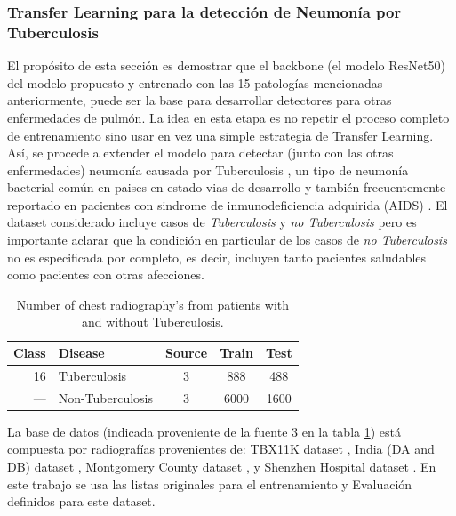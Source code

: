 {\subsubsection{Transfer Learning para la detección de Neumonía por Tuberculosis}

El propósito de esta sección es demostrar que el backbone (el modelo ResNet50) del modelo propuesto
y entrenado con las 15 patologías mencionadas anteriormente, puede ser la base para desarrollar
detectores para otras enfermedades de pulmón. La idea en esta etapa es no repetir el proceso
completo de entrenamiento sino usar en vez una simple estrategia de Transfer Learning. Así, se
procede a extender el modelo para detectar (junto con las otras enfermedades) neumonía causada por
Tuberculosis \cite{stirenko2018chest}, un tipo de neumonía bacterial común en paises en estado vias
de desarrollo y también frecuentemente reportado en pacientes con sindrome de inmunodeficiencia
adquirida (AIDS) \cite{matsuura2018tuberculous}. El dataset considerado incluye casos de
\textit{Tuberculosis} y \textit{no Tuberculosis} pero es
importante aclarar que la condición en particular de los casos de \textit{no Tuberculosis} no es
especificada por completo, es decir, incluyen tanto pacientes saludables como pacientes con otras
afecciones.

\begin{table}[!ht]
    \centering
    \begin{tabular}{| r |l | c | c | c |}
     \hline
     Class & Disease & Source & Train & Test  \\
     \hline\hline
     16  & Tuberculosis        & 3 & 888   & 488  \\
     ---&  Non-Tuberculosis     & 3 & 6000  & 1600 \\
     \hline
    \end{tabular}
    \caption{Number of chest radiography's from patients with and without Tuberculosis.}
\label{table_dataset_tb}
\end{table}

La base de datos (indicada proveniente de la fuente 3 en la tabla \ref{table_dataset_tb}) está
compuesta por radiografías provenientes de: TBX11K dataset \cite{liu2020rethinking},
India (DA and DB) dataset \cite{chauhan2014role}, Montgomery County dataset \cite{jaeger2014two}, y
Shenzhen Hospital dataset \cite{jaeger2014two}. En este trabajo se usa las listas originales para el
entrenamiento y Evaluación definidos para este dataset.

}
